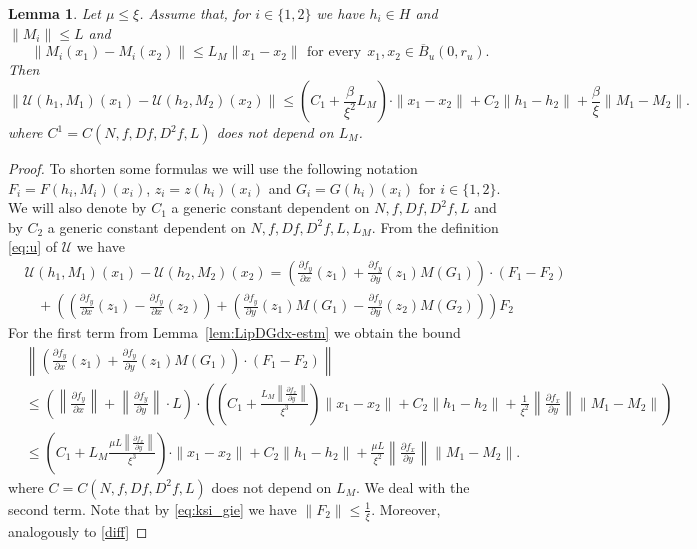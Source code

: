 \documentclass[11pt, leqno]{amsart}
\newtheorem{lem}[thm]{Lemma}
\theoremstyle{definition}
\begin{document}
\begin{lem}
\label{lem:LipT2-estm}
Let $\mu\leq \xi$. Assume that, for $i\in \{1,2\}$ we have $h_i
\in H$ and $\|M_i\| \leq L$ and
\begin{equation}
	\|M_i(x_1) - M_i(x_2)\| \leq L_M \|x_1-x_2\|\, \ \textrm{for every}\ \ x_1,x_2\in \overline{B}_u(0,r_u).
\end{equation}
Then
\begin{equation}
 \left\|\mathcal{U}(h_1,M_1)(x_1)- \mathcal{U}(h_2,M_2)(x_2)\right\| \leq  \left(C_1 + \frac{\beta}{\xi^2} L_M \right) \cdot \|x_1-x_2\| + C_2\|h_1-h_2\|+\frac{\beta}{\xi}\|M_1-M_2\|. 
\end{equation}
where $C^1=C(N,f,Df,D^2f,L)$ does not depend on $L_M$.
\end{lem}
\begin{proof}
To shorten some formulas we will use the following notation $F_i=F(h_i,M_i)(x_i)$, $z_i=z(h_i)(x_i)$  and $G_i=G(h_i)(x_i)$ for $i\in \{1,2\}$. We will also denote by $C_1$ a generic constant dependent on $N, f, Df, D^2f, L$ and by $C_2$ a generic constant dependent on $N, f, Df, D^2f, L, L_M$. 
From the definition \eqref{eq:u} of $\mathcal{U}$ we have
\begin{align*}
  &\mathcal{U}(h_1,M_1)(x_1)- \mathcal{U}(h_2,M_2)(x_2) = \left(\frac{\partial f_y}{\partial x}(z_1) + \frac{\partial f_y}{\partial y}(z_1)M(G_1) \right) \cdot  (F_1 - F_2) \\
  &\ \ \ \ + \left( \left(\frac{\partial f_y}{\partial x}(z_1) - \frac{\partial f_y}{\partial x}(z_2) \right)
     + \left(\frac{\partial f_y}{\partial y}(z_1)M(G_1)
    - \frac{\partial f_y}{\partial y}(z_2)M(G_2) \right) \right) F_2
\end{align*}
For the first term from Lemma~\ref{lem:LipDGdx-estm}  we obtain the bound
\begin{align*}
 &  \left\|\left(\frac{\partial f_y}{\partial x}(z_1) + \frac{\partial f_y}{\partial y}(z_1)M(G_1) \right) \cdot  (F_1 - F_2)\right\|\\
 &  \leq 
  \left(\left\|\frac{\partial f_y}{\partial x}\right\| + \left\|\frac{\partial f_y}{\partial y} \right\| \cdot L \right) \cdot \left(\left(C_1  + \frac{L_M  \left\|\frac{\partial f_x}{\partial y}\right\|}{\xi^3} \right) \|x_1-x_2\| + C_2 \|h_1-h_2\| + \frac{1}{\xi^2}\left\|\frac{\partial f_x}{\partial y}\right\|\|M_1-M_2\|\right)\\
  &\leq \left( C_1 +  L_M  \frac{\mu L \left\|\frac{\partial f_x}{\partial y}\right\|}{\xi^3}  \right)\cdot \|x_1-x_2\| + C_2\|h_1-h_2\| +  \frac{\mu L}{\xi^2}\left\|\frac{\partial f_x}{\partial y}\right\|\|M_1-M_2\|. 
\end{align*}
where $C=C(N,f,Df,D^2f,L)$ does not depend on $L_M$.
We deal with the second term. Note that by  \eqref{eq:ksi_gie}  we have $\|F_2\|\leq \frac{1}{\xi}$. Moreover, analogously to \eqref{diff}


\end{proof}
\end{document}
